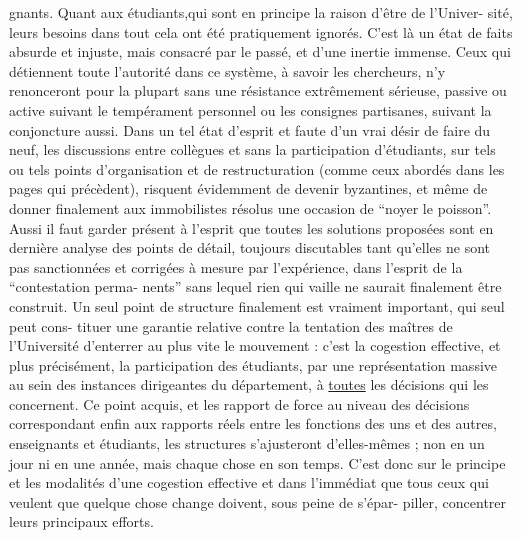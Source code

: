 
gnants. Quant aux étudiants,qui sont en principe la raison d'être de l'Univer-%
sité, leurs besoins dans tout cela ont été pratiquement ignorés. C'est là
un état de faits absurde et injuste, mais consacré par le passé, et d'une inertie
immense. Ceux qui détiennent toute l'autorité dans ce système, à savoir les
chercheurs, n'y renonceront pour la plupart sans une résistance extrêmement
sérieuse, passive ou active suivant le tempérament personnel ou les consignes
partisanes, suivant la conjoncture aussi. Dans un tel état d'esprit et faute
d'un vrai désir de faire du neuf, les discussions entre collègues et sans la
participation d'étudiants, sur tels ou tels points d'organisation et de
restructuration (comme ceux abordés dans les pages qui précèdent), risquent
évidemment de devenir byzantines, et même de donner finalement aux immobilistes
résolus une occasion de ``noyer le poisson''. Aussi il faut garder présent à
l'esprit que toutes les solutions proposées sont en dernière analyse des points
de détail, toujours discutables tant qu'elles ne sont pas sanctionnées et
corrigées à mesure par l'expérience, dans l'esprit de la ``contestation perma-%
nents'' sans lequel rien qui vaille ne saurait finalement être construit. Un
seul point de structure finalement est vraiment important, qui seul peut cons-%
tituer une garantie relative contre la tentation des maîtres de l'Université
d'enterrer au plus vite le mouvement : c'est la cogestion effective, et plus
précisément, la participation des étudiants, par une représentation massive
au sein des instances dirigeantes du département, à \uline{toutes} les décisions qui
les concernent. Ce point acquis, et les rapport de force au niveau des décisions 
correspondant enfin aux rapports réels entre les fonctions des uns et des
autres, enseignants et étudiants, les structures s'ajusteront d'elles-mêmes ;
non en un jour ni en une année, mais chaque chose en son temps. C'est donc sur
le principe et les modalités d'une cogestion effective et dans l'immédiat que
tous ceux qui veulent que quelque chose change doivent, sous peine de s'épar-%
piller, concentrer leurs principaux efforts.

